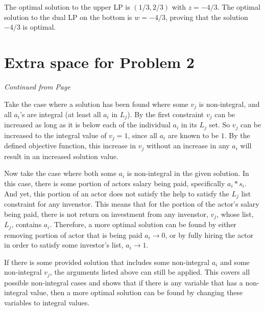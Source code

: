 \documentclass[11pt]{article}
\begin{document}

The optimal solution to the upper LP is  $(1/3,2/3)$ with $z=-4/3$. The optimal
solution to the dual LP on the bottom is $w=-4/3$, proving that the solution
$-4/3$ is optimal.

 \newpage
 
 
\section*{Extra space for Problem 2}
\emph{Continued from Page \pageref{pg:end-of-p2}}
 
 
\label{pg:p2-continuation}

Take the case where a solution has been found where some  $v_j$ is non-integral,
and all $a_i$'s are integral (at least all $a_i$ in $L_j$). 
By the first constraint $v_j$ can be increased as long as it is below each 
of the individual $a_i$ in its $L_j$ set. So $v_j$ can be increased to the 
integral value of $v_j=1$, since all $a_i$ are known to be $1$. By the defined
objective function, this increase in $v_j$ without an increase in any $a_i$ will
result in an increased solution value.

Now take the case where both some $a_i$ is non-integral in 
the given solution. In this case, there is some portion of actors salary being
paid, specifically $a_i*s_i$. And yet, this portion of an actor does 
not satisfy the help to satisfy the $L_j$ list constraint for any invenstor. This
means that for the portion of the actor's salary being paid, there is not
return on investment from any invenstor, $v_j$, whose list,  $L_j$,  contains $a_i$.
Therefore, a more optimal solution can be found by either removing portion of 
actor that is being paid $a_i\rightarrow 0$, or by fully hiring the actor in order
to satisfy some investor's list, $a_i \rightarrow 1$. 

If there is some provided solution that includes some non-integral $a_i$ and 
some non-integral $v_j$, the arguments listed above can still be applied. This
covers all possible non-integral cases and shows that if there is any variable
that has a non-integral value, then a more optimal solution can be found by
changing these variables to integral values.

\newpage
 
\end{document}
